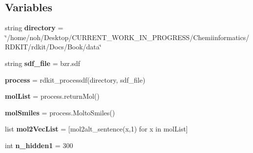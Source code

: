 \subsection*{Variables}
\begin{DoxyCompactItemize}
\item
\mbox{\label{namespacechemistry2quant_1_1chem2quant__analysis_aa425a3a32b624b3b85403ce5b02117a2}}
string {\bfseries directory} = \char`\"{}/home/noh/Desktop/C\+U\+R\+R\+E\+N\+T\+\_\+\+W\+O\+R\+K\+\_\+\+I\+N\+\_\+\+P\+R\+O\+G\+R\+E\+SS/Chemiinformatics/R\+D\+K\+IT/rdkit/Docs/Book/data\char`\"{}
\item
\mbox{\label{namespacechemistry2quant_1_1chem2quant__analysis_a6a60e479c89a6ce5b45a773975d5a338}}
string {\bfseries sdf\+\_\+file} = \textquotesingle{}bzr.\+sdf\textquotesingle{}
\item
\mbox{\label{namespacechemistry2quant_1_1chem2quant__analysis_a1bf76568a72e486d531841905fdde599}}
{\bfseries process} = rdkit\+\_\+processdf(directory, sdf\+\_\+file)
\item
\mbox{\label{namespacechemistry2quant_1_1chem2quant__analysis_afa8eaf38c632fe7394eb202dad83df62}}
{\bfseries mol\+List} = process.\+return\+Mol()
\item
\mbox{\label{namespacechemistry2quant_1_1chem2quant__analysis_a2c39d2f4caa1c4b277791bf793499d18}}
{\bfseries mol\+Smiles} = process.\+Molto\+Smiles()
\item
\mbox{\label{namespacechemistry2quant_1_1chem2quant__analysis_a7864a43f1dbb4a3a1c15dc6cd297b63e}}
list {\bfseries mol2\+Vec\+List} = \mbox{[}mol2alt\+\_\+sentence(x,1) for x in mol\+List\mbox{]}
\item
\mbox{\label{namespacechemistry2quant_1_1chem2quant__analysis_a88c20c3b113b279415e137750a664f2b}}
int {\bfseries n\+\_\+hidden1} = 300
\item
\mbox{\label{namespacechemistry2quant_1_1chem2quant__analysis_ac89b6a23f0dd409c07840675c1a9dd1d}}

\end{DoxyCompactItemize}

